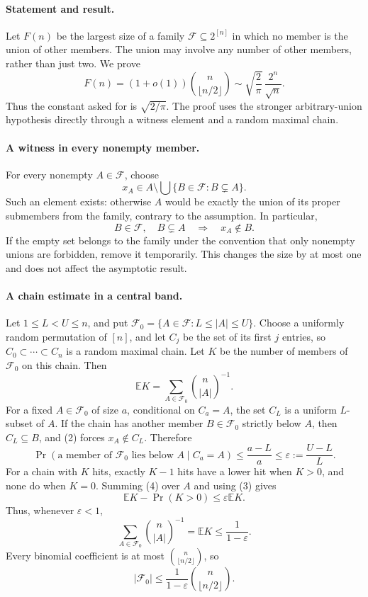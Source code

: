 \paragraph{Statement and result.}
Let \(F(n)\) be the largest size of a family \(\mathcal F\subseteq2^{[n]}\) in which no member is the union of other members. The union may involve any number of other members, rather than just two. We prove
\[
 F(n)=(1+o(1))\binom n{\lfloor n/2\rfloor}
 \sim\sqrt{\frac2\pi}\,\frac{2^n}{\sqrt n}.
\]
Thus the constant asked for is \(\sqrt{2/\pi}\). The proof uses the stronger arbitrary-union hypothesis directly through a witness element and a random maximal chain.

\paragraph{A witness in every nonempty member.}
For every nonempty \(A\in\mathcal F\), choose
\[
 x_A\in A\setminus\bigcup\{B\in\mathcal F:B\subsetneq A\}. \tag{1}
\]
Such an element exists: otherwise \(A\) would be exactly the union of its proper submembers from the family, contrary to the assumption. In particular,
\[
 B\in\mathcal F,\quad B\subsetneq A
 \quad\Longrightarrow\quad x_A\notin B. \tag{2}
\]
If the empty set belongs to the family under the convention that only nonempty unions are forbidden, remove it temporarily. This changes the size by at most one and does not affect the asymptotic result.

\paragraph{A chain estimate in a central band.}
Let \(1\leq L<U\leq n\), and put
\(\mathcal F_0=\{A\in\mathcal F:L\leq|A|\leq U\}\).
Choose a uniformly random permutation of \([n]\), and let \(C_j\) be the set of its first \(j\) entries, so \(C_0\subset\cdots\subset C_n\) is a random maximal chain. Let \(K\) be the number of members of \(\mathcal F_0\) on this chain. Then
\[
 \mathbb E K=\sum_{A\in\mathcal F_0}\binom n{|A|}^{-1}. \tag{3}
\]
For a fixed \(A\in\mathcal F_0\) of size \(a\), conditional on \(C_a=A\), the set \(C_L\) is a uniform \(L\)-subset of \(A\). If the chain has another member \(B\in\mathcal F_0\) strictly below \(A\), then \(C_L\subseteq B\), and (2) forces \(x_A\notin C_L\). Therefore
\[
 \Pr(\text{a member of }\mathcal F_0\text{ lies below }A\mid C_a=A)
 \leq\frac{a-L}{a}\leq\varepsilon:=\frac{U-L}{L}. \tag{4}
\]
For a chain with \(K\) hits, exactly \(K-1\) hits have a lower hit when \(K>0\), and none do when \(K=0\). Summing (4) over \(A\) and using (3) gives
\[
 \mathbb E K-\Pr(K>0)\leq\varepsilon\mathbb E K.
\]
Thus, whenever \(\varepsilon<1\),
\[
 \sum_{A\in\mathcal F_0}\binom n{|A|}^{-1}
 =\mathbb E K\leq\frac1{1-\varepsilon}. \tag{5}
\]
Every binomial coefficient is at most \(\binom n{\lfloor n/2\rfloor}\), so
\[
 |\mathcal F_0|\leq\frac1{1-\varepsilon}
                       \binom n{\lfloor n/2\rfloor}. \tag{6}
\]

